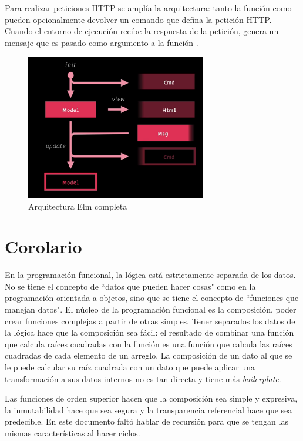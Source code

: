 \documentclass{article}
\newcommand{\code}[1]{\tcbox{\texttt{#1}}}
\begin{document}
Para realizar peticiones HTTP se amplía la arquitectura: tanto la función \code{init} como \code{update} pueden opcionalmente devolver un comando que defina la petición HTTP. Cuando el entorno de ejecución recibe la respuesta de la petición, genera un mensaje que es pasado como argumento a la función \code{update}.
\begin{figure}[h]
\centering
\includegraphics[width=0.7\textwidth]{complete-elm-architecture}
\caption{Arquitectura Elm completa}
\end{figure}

\pagebreak
\section{Corolario}
En la programación funcional, la lógica está estrictamente separada de los datos. No se tiene el concepto de ``datos que pueden hacer cosas" \medspace como en la programación orientada a objetos, sino que se tiene el concepto de ``funciones que manejan datos". El núcleo de la programación funcional es la composición, poder crear funciones complejas a partir de otras simples. Tener separados los datos de la lógica hace que la composición sea fácil: el resultado de combinar una función que calcula raíces cuadradas con la función \code{map} es una función que calcula las raíces cuadradas de cada elemento de un arreglo. La composición de un dato al que se le puede calcular su raíz cuadrada con un dato que puede aplicar una transformación a sus datos internos no es tan directa y tiene más \textit{boilerplate}.

Las funciones de orden superior hacen que la composición sea simple y expresiva, la inmutabilidad hace que sea segura y la transparencia referencial hace que sea predecible. En este documento faltó hablar de recursión para que se tengan las mismas características al hacer ciclos. 
\end{document}

